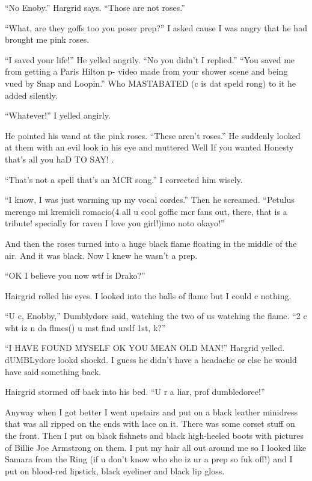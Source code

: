 \enquote{No Enoby.} Hargrid says. \enquote{Those are not roses.}

\enquote{What, are they goffs too you poser prep?} I asked cause I was angry that he had brought me pink roses.

\enquote{I saved your life!} He yelled angrily. \enquote{No you didn't I replied.} \enquote{You saved me from getting a Paris Hilton p- video made from your shower scene and being vued by Snap and Loopin.} Who MASTABATED (c is dat speld rong) to it he added silently.

\enquote{Whatever!} I yelled angirly.

He pointed his wand at the pink roses. \enquote{These aren't roses.} He suddenly looked at them with an evil look in his eye and muttered Well If you wanted Honesty that's all you haD TO SAY! .

\enquote{That's not a spell that's an MCR song.} I corrected him wisely.

\enquote{I know, I was just warming up my vocal cordes.} Then he screamed. \enquote{Petulus merengo mi kremicli romacio(4 all u cool gof\-fic mcr fans out, there, that is a tribute! specially for raven I love you girl!)imo noto okayo!}

And then the roses turned into a huge black flame floating in the middle of the air. And it was black. Now I knew he wasn't a prep.

\enquote{OK I believe you now wtf is Drako?}

Hairgrid rolled his eyes. I looked into the balls of flame but I could c nothing.

\enquote{U c, Enobby,} Dumblydore said, watching the two of us watching the flame. \enquote{2 c wht iz n da flmes() u mst find urslf 1st, k?}

\enquote{I HAVE FOUND MYSELF OK YOU MEAN OLD MAN\@!} Hargrid yelled. dUMBLydore lookd shockd. I guess he didn't have a headache or else he would have said something back.

Hairgrid stormed off back into his bed. \enquote{U r a liar, prof dumbledoree!}

Anyway when I got better I went upstairs and put on a black leather minidress that was all ripped on the ends with lace on it. There was some corset stuff on the front. Then I put on black fishnets and black high-heeled boots with pictures of Billie Joe Armstrong on them. I put my hair all out around me so I looked like Samara from the Ring (if u don't know who she iz ur a prep so fuk off!) and I put on blood-red lipstick, black eyeliner and black lip gloss.

